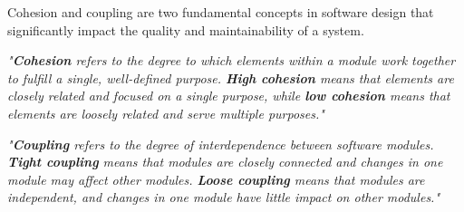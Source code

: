 
Cohesion and coupling are two fundamental concepts in software design that significantly impact the quality and maintainability of a system. \\



\begin{center}
\textit{"\textbf{Cohesion} refers to the degree to which elements within a module work together to fulfill a single, well-defined purpose. \textbf{High cohesion} means that elements are closely related and focused on a single purpose, while \textbf{low cohesion} means that elements are loosely related and serve multiple purposes."} \cite{geeksforgeeks:c&c} \\
\end{center}

\begin{center}
\textit{"\textbf{Coupling} refers to the degree of interdependence between software modules. \textbf{Tight coupling} means that modules are closely connected and changes in one module may affect other modules. \textbf{Loose coupling} means that modules are independent, and changes in one module have little impact on other modules."} \cite{geeksforgeeks:c&c} \\
\end{center}

